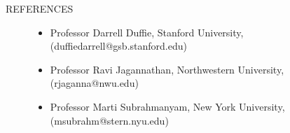\documentclass{article}
\begin{document}
\begin{description}
\item[REFERENCES] \mbox{}

\begin{itemize}
\setlength\itemsep{-0.1em}

\item Professor Darrell Duffie, Stanford University, (duffiedarrell@gsb.stanford.edu) 


\item Professor Ravi Jagannathan, Northwestern University, (rjaganna@nwu.edu)

\item Professor Marti Subrahmanyam, New York University, (msubrahm@stern.nyu.edu)

\end{itemize}

\end{description}




\end{document}

